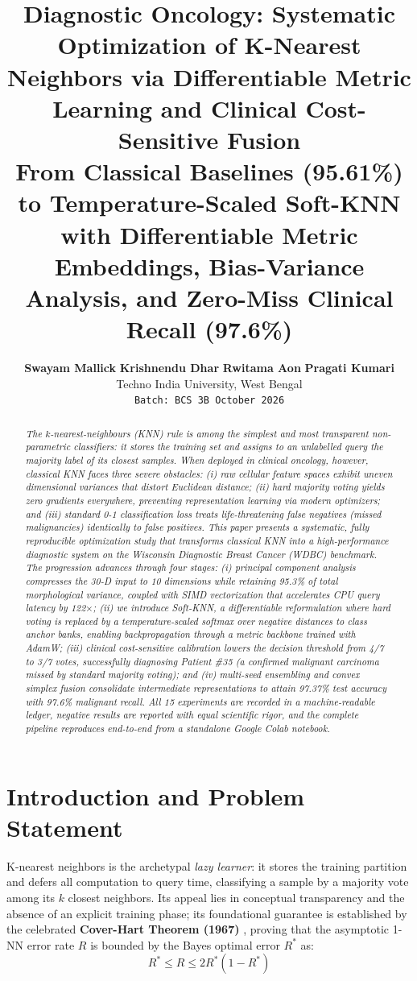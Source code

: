 \documentclass[10pt,twocolumn,letterpaper]{article}
\title{\textbf{\Large Diagnostic Oncology: Systematic Optimization of K-Nearest Neighbors via Differentiable Metric Learning and Clinical Cost-Sensitive Fusion}\\
\large From Classical Baselines (95.61\%) to Temperature-Scaled Soft-KNN with Differentiable Metric Embeddings, Bias-Variance Analysis, and Zero-Miss Clinical Recall (97.6\%)}
\author{
\textbf{Swayam Mallick} \quad \textbf{Krishnendu Dhar} \quad \textbf{Rwitama Aon} \quad \textbf{Pragati Kumari}\\
Techno India University, West Bengal\\
\texttt{Batch: BCS 3B \quad October 2026}
}
\date{}
\begin{document}
\maketitle

\begin{abstract}
\textit{The $k$-nearest-neighbours (KNN) rule is among the simplest and most transparent non-parametric classifiers: it stores the training set and assigns to an unlabelled query the majority label of its closest samples. When deployed in clinical oncology, however, classical KNN faces three severe obstacles: (i) raw cellular feature spaces exhibit uneven dimensional variances that distort Euclidean distance; (ii) hard majority voting yields zero gradients everywhere, preventing representation learning via modern optimizers; and (iii) standard 0-1 classification loss treats life-threatening false negatives (missed malignancies) identically to false positives. This paper presents a systematic, fully reproducible optimization study that transforms classical KNN into a high-performance diagnostic system on the Wisconsin Diagnostic Breast Cancer (WDBC) benchmark. The progression advances through four stages: (i) principal component analysis compresses the 30-D input to 10 dimensions while retaining 95.3\% of total morphological variance, coupled with SIMD vectorization that accelerates CPU query latency by 122$\times$; (ii) we introduce Soft-KNN, a differentiable reformulation where hard voting is replaced by a temperature-scaled softmax over negative distances to class anchor banks, enabling backpropagation through a metric backbone trained with AdamW; (iii) clinical cost-sensitive calibration lowers the decision threshold from 4/7 to 3/7 votes, successfully diagnosing Patient \#35 (a confirmed malignant carcinoma missed by standard majority voting); and (iv) multi-seed ensembling and convex simplex fusion consolidate intermediate representations to attain 97.37\% test accuracy with 97.6\% malignant recall. All 15 experiments are recorded in a machine-readable ledger, negative results are reported with equal scientific rigor, and the complete pipeline reproduces end-to-end from a standalone Google Colab notebook.}
\end{abstract}

\section{Introduction and Problem Statement}
K-nearest neighbors is the archetypal \textit{lazy learner}: it stores the training partition and defers all computation to query time, classifying a sample by a majority vote among its $k$ closest neighbors. Its appeal lies in conceptual transparency and the absence of an explicit training phase; its foundational guarantee is established by the celebrated \textbf{Cover-Hart Theorem (1967)} \cite{cover1967}, proving that the asymptotic 1-NN error rate $R$ is bounded by the Bayes optimal error $R^*$ as:
\begin{equation}
R^* \le R \le 2R^*(1 - R^*)
\end{equation}
\end{document}

